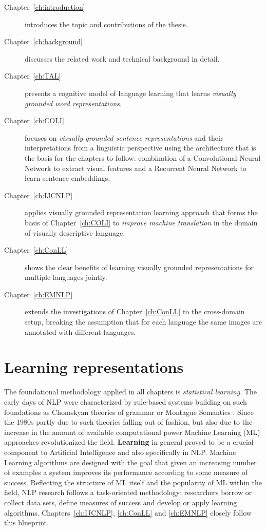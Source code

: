 \begin{description}
\item[Chapter~\ref{ch:introduction}] introduces the topic and contributions of
the thesis.

\item[Chapter~\ref{ch:background}] discusses the related work and technical background in detail.

\item[Chapter~\ref{ch:TAL}] presents
a cognitive model of language learning that learns \emph{visually grounded word representations}.

\item[Chapter~\ref{ch:COLI} ] focuses on \emph{visually grounded sentence representations} and their
interpretations from a linguistic perspective using the architecture that is the basis
for the chapters to follow: combination of a Convolutional Neural Network to extract visual features and
a Recurrent Neural Network to learn sentence embeddings.

\item[Chapter~\ref{ch:IJCNLP}] applies visually grounded representation learning approach that forms the
basis of Chapter~\ref{ch:COLI} to \emph{improve machine translation} in the domain of visually descriptive language.

\item[Chapter~\ref{ch:ConLL}] shows the clear benefits of learning visually grounded representations
for multiple languages jointly.

\item[Chapter~\ref{ch:EMNLP}] extends the investigations of Chapter~\ref{ch:ConLL} to the
cross-domain setup, breaking the assumption that for each language the same images are annotated
with different languages.
\end{description}



\section{Learning representations}
The foundational methodology applied in all chapters is \emph{statistical learning}.
The early days of NLP were characterized by rule-based systems building on such
foundations as Chomskyan theories of grammar \citep{chomsky2002syntactic} or 
Montague Semantics \citep{montague1970english}.
Since the 1980s partly due to such theories falling out of fashion, 
but also due to the increase in the amount
of available computational power Machine Learning (ML) approaches revolutionized
the field.  \textbf{Learning} in general proved to be a crucial component to Artificial Intelligence and also
specifically in NLP. Machine Learning algorithms are designed with the goal that given an increasing
number of examples a system improves its performance according to some measure of success.
Reflecting the structure of ML itself and the popularity of ML within the field, NLP research follows
a task-oriented methodology: researchers borrow or collect data sets, define measures of success and develop or
apply learning algorithms. Chapters~\ref{ch:IJCNLP}, \ref{ch:ConLL} and
\ref{ch:EMNLP}  closely follow this blueprint.

